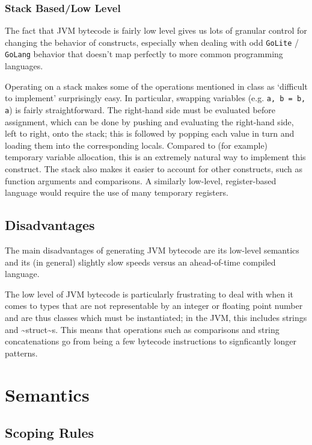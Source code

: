 \documentclass[11pt]{article}
\begin{document}
\subsubsection{Stack Based/Low Level}
\label{sec:org4cbab86}
The fact that JVM bytecode is fairly low level gives us lots of granular
control for changing the behavior of constructs, especially when
dealing with odd \texttt{GoLite} / \texttt{GoLang} behavior that doesn't
map perfectly to more common programming languages.

Operating on a stack makes some of the operations mentioned in class as
`difficult to implement' surprisingly easy. In particular, swapping
variables (e.g. \texttt{a, b = b, a}) is fairly straightforward. The right-hand
side must be evaluated before assignment, which can be done by pushing and
evaluating the right-hand side, left to right, onto the stack; this is
followed by popping each value in turn and loading them into the
corresponding locals. Compared to (for example) temporary variable
allocation, this is an extremely natural way to implement this construct.
The stack also makes it easier to account for other constructs, such as
function arguments and comparisons. A similarly low-level, register-based
language would require the use of many temporary registers.

\subsection{Disadvantages}
\label{sec:org2fe95ff}
The main disadvantages of generating JVM bytecode are its low-level semantics
and its (in general) slightly slow speeds versus an ahead-of-time compiled
language.

The low level of JVM bytecode is particularly frustrating to deal with when
it comes to types that are not representable by an integer or floating point
number and are thus classes which must be instantiated; in the JVM, this
includes strings and \textasciitilde{}struct\textasciitilde{}s. This means that operations such as
comparisons and string concatenations go from being a few bytecode
instructions to signficantly longer patterns.
\section{Semantics}
\label{sec:org6cf3c86}
\subsection{Scoping Rules}
\label{sec:org7aa6ebe}
\end{document}
